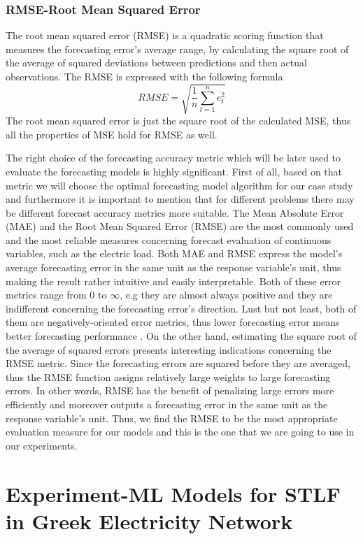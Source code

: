 \subsection{RMSE-Root Mean Squared Error}
The root mean squared error (RMSE) is a quadratic scoring function that measures the forecasting error's average range, by calculating the square root of the average of squared deviations between predictions and then actual observations. The RMSE is expressed with the following formula $$RMSE=\sqrt{\frac{1}{n}\sum_{t=1}^{n}{e_{t}^2}}$$
The root mean squared error is just the square root of the calculated MSE, thus all the properties of MSE hold for RMSE as well. 
\par The right choice of the forecasting accuracy metric which will be later used to evaluate the forecasting models is highly significant. First of all, based on that metric we will choose the optimal forecasting model algorithm for our case study and furthermore it is important to mention that for different problems there may be different forecast accuracy metrics more suitable. The Mean Absolute Error (MAE) and the Root Mean Squared Error (RMSE) are the most commonly used and the most reliable measures concerning forecast evaluation of continuous variables, such as the electric load. Both MAE and RMSE express the model's average forecasting error in the same unit as the response variable's unit, thus making the result rather intuitive and easily interpretable. Both of these error metrics range from 0 to $\infty$, e.g they are almost always positive and they are indifferent concerning the forecasting error's direction. Lust but not least, both of them are negatively-oriented error metrics, thus lower forecasting error means better forecasting performance \cite{hyndman2006another}. On the other hand, estimating the square root of the average of squared errors presents interesting indications concerning the RMSE metric. Since the forecasting errors are squared before they are averaged, thus the RMSE function assigns relatively large weights to large forecasting errors. In other words, RMSE has the benefit of penalizing large errors more efficiently and moreover outputs a forecasting error in the same unit as the response variable's unit. Thus, we find the RMSE to be the most appropriate evaluation measure for our models and this is the one that we are going to use in our experiments.


\chapter{Experiment-ML Models for STLF in Greek Electricity Network}
